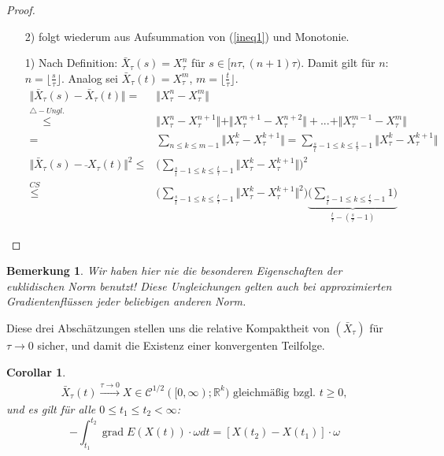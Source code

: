 \documentclass[11pt,a4paper,notitlepage]{scrreprt}
\newcommand{\RR}{\mathbb{R}}
\newcommand{\grad}{\operatorname{grad}}
\newtheorem{cor}[defi]{Corollar}
\newtheorem{bem}[defi]{Bemerkung}
\begin{document}
\begin{proof}
\begin{itemize}
\item[2)] folgt wiederum aus Aufsummation von (\ref{ineq1}) und Monotonie.
\item[1)] Nach Definition: $\bar{X}_\tau(s)=X_\tau^n$ für $s\in [n\tau,(n+1)\tau)$. Damit gilt für $n$: $n=\lfloor \frac{s}{\tau}\rfloor$. Analog sei $\bar{X}_\tau(t)=X_\tau^m$, $m=\lfloor\frac{t}{\tau}\rfloor$.\\
\begin{align*}
\Vert \bar{X}_\tau(s)-\bar{X}_\tau(t)\Vert=&\Vert X_\tau^n-X_\tau^m\Vert \\\overset{\triangle -Ungl.}\leq&\Vert X_\tau^n-X_\tau^{n+1}\Vert+\Vert X_\tau^{n+1}-X_\tau^{n+2}\Vert+...+\Vert X_\tau^{m-1}-X_\tau^m\Vert\\
=&\sum_{n\leq k\leq m-1}\Vert X_\tau^k-X_\tau^{k+1}\Vert=\sum_{\frac{s}{t}-1\leq k\leq \frac{t}{\tau}-1}\Vert X_\tau^k-X_\tau^{k+1}\Vert\\
\Vert \bar{X}_\tau(s)-\bar{}X_\tau(t)\Vert^2\leq&\Bigg(\sum_{\frac{s}{t}-1\leq k\leq \frac{t}{\tau}-1}\Vert X_\tau^k-X_\tau^{k+1}\Vert\Bigg)^2 \\ \overset{CS}\leq&\Bigg(\sum_{\frac{s}{t}-1\leq k\leq \frac{t}{\tau}-1}\Vert X_\tau^k-X_\tau^{k+1}\Vert^2\Bigg)\underset{\frac{t}{\tau}-(\frac{s}{\tau}-1)}{\underbrace{\Bigg(\sum_{\frac{s}{t}-1\leq k\leq \frac{t}{\tau}-1}1\Bigg)}}
\end{align*}
\end{itemize}
\end{proof}




\begin{bem}
Wir haben hier nie die besonderen Eigenschaften der euklidischen Norm benutzt! Diese Ungleichungen gelten auch bei approximierten Gradientenflüssen jeder beliebigen anderen Norm.
\end{bem}

Diese drei Abschätzungen stellen uns die relative Kompaktheit von $(\bar{X}_\tau)$ für $\tau \to 0$ sicher, und damit die Existenz einer konvergenten Teilfolge.  \\
\begin{cor}
\begin{eqnarray*}
\bar{X}_\tau(t) \overset{\tau\to0}{\longrightarrow} X \in \mathcal{C}^{1/2}([0,\infty);\RR^k) \text{ gleichmäßig bzgl. }t\geq 0,
\end{eqnarray*}
und es gilt für alle $0\leq t_1\leq t_2<\infty$:
\begin{equation}
-\int_{t_1}^{t_2}\grad E(X(t))\cdot \omega dt = [X(t_2)-X(t_1)]\cdot\omega
\end{equation}
\end{cor}
\end{document}
